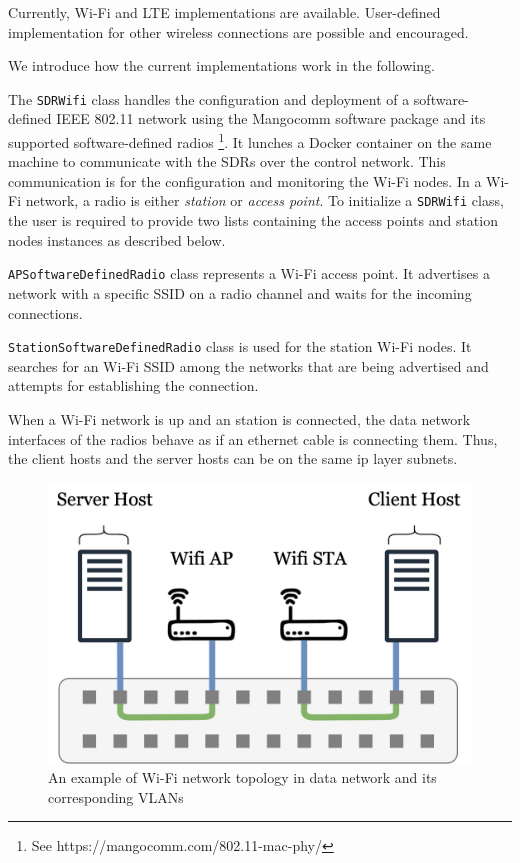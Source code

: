 Currently, Wi-Fi and \gls{LTE} implementations are available.
User-defined implementation for other wireless connections are possible and encouraged.

We introduce how the current implementations work in the following.

\begin{description}[style=nextline]
    \item[SDR-based Wi-Fi Network]
    The \texttt{SDRWifi} class handles the configuration and deployment of a software-defined IEEE 802.11 network using the Mangocomm software package and its supported software-defined radios \footnote{See https://mangocomm.com/802.11-mac-phy/}.
    It lunches a Docker container on the same machine to communicate with the \glspl{SDR} over the control network.
    This communication is for the configuration and monitoring the Wi-Fi nodes.
    In a Wi-Fi network, a radio is either \emph{station} or \emph{access point}.
    To initialize a \texttt{SDRWifi} class, the user is required to provide two lists containing the access points and station nodes instances as described below.
    
    \texttt{APSoftwareDefinedRadio} class represents a Wi-Fi access point.
    It advertises a network with a specific SSID on a radio channel and waits for the incoming connections.

    \texttt{StationSoftwareDefinedRadio} class is used for the station Wi-Fi nodes.
    It searches for an Wi-Fi \gls{SSID} among the networks that are being advertised and attempts for establishing the connection.
    
    When a Wi-Fi network is up and an station is connected, the data network interfaces of the radios behave as if an ethernet cable is connecting them.
    Thus, the client hosts and the server hosts can be on the same ip layer subnets.
    \begin{figure}[t]
        \centering
        \includegraphics[width=0.8\linewidth]{figures/wifi.png}
        \caption{An example of Wi-Fi network topology in data network and its corresponding \glspl{VLAN}}
        \label{fig:wifi}
    \end{figure}


\end{description}
